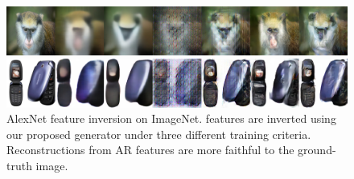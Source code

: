 \begin{figure}[t]
\includegraphics[width=\textwidth]{figs/ablation/ablation_tile2.jpg}

\includegraphics[width=\textwidth]{figs/ablation/ablation_tile9.jpg}

\caption{\label{fig:inversion_alexnet}AlexNet feature inversion on ImageNet.  features are inverted using our proposed generator under three different training criteria. Reconstructions from AR features are more faithful to the ground-truth image.}
\vspace{-0.4cm}
\end{figure}
